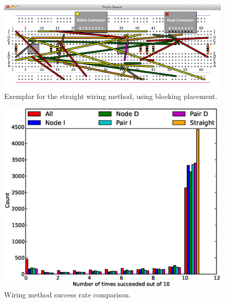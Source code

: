 \begin{figure}[H]
\begin{center}
\includegraphics[width=\textwidth]{Images/exemplar_straight_wiring.png}
\caption[Straight wiring method exemplar]{
Exemplar for the straight wiring method, using blocking placement.}
\end{center}
\end{figure}

\begin{figure}[H]
\begin{center}
\includegraphics[width=15cm]{Images/wiring_success_comparison.eps}
\caption[Wiring method success rate comparison]{Wiring method success rate
comparison.}
\label{fig:wiring_success}
\end{center}
\end{figure}

